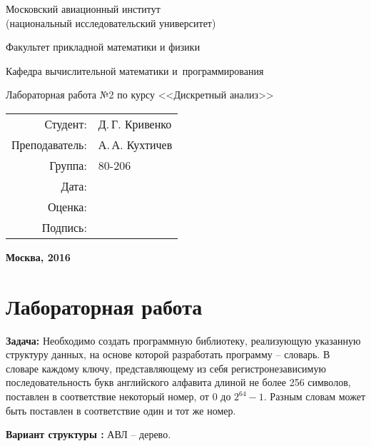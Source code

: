 \documentclass[pdf, unicode, 12pt, a4paper,oneside,fleqn]{article}
\newcommand{\CWHeader}[1]{\section*{#1}}
\newcommand{\CWProblem}[1]{\par\textbf{Задача: }#1}
\begin{document}
\begin{titlepage}
\begin{center}
\bfseries

{\Large Московский авиационный институт\\ (национальный исследовательский университет)

}

\vspace{48pt}

{\large Факультет прикладной математики и физики

}

\vspace{36pt}


{\large Кафедра вычислительной математики и~программирования

}


\vspace{48pt}

{ Лабораторная работа №2 по курсу <<Дискретный анализ>>}

\end{center}

\vspace{72pt}

\begin{flushright}
\begin{tabular}{rl}
Студент: & Д.\,Г. Кривенко \\
Преподаватель: & А.\,А. Кухтичев \\
Группа: & 80-206 \\
Дата: & \\
Оценка: & \\
Подпись: & \\
\end{tabular}
\end{flushright}

\vfill

\begin{center}
\bfseries
Москва, 2016
\end{center}
\end{titlepage}

\pagebreak
\newpage

\CWHeader{Лабораторная работа }

\CWProblem{
Необходимо создать программную библиотеку, реализующую указанную структуру данных, на основе которой разработать программу -- словарь. В словаре каждому ключу, представляющему из себя регистронезависимую последовательность букв английского алфавита длиной не более 256 символов, поставлен в соответствие некоторый номер, от 0 до $2^{64} - 1$. Разным словам может быть поставлен в соответствие один и тот же номер.

{\bfseries Вариант структуры :} АВЛ -- дерево.
}
\pagebreak
\end{document}
